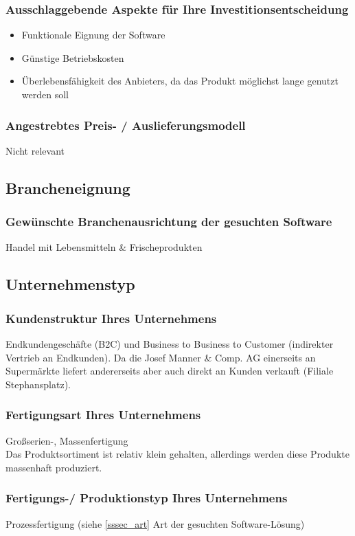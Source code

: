 \subsubsection{Ausschlaggebende Aspekte für Ihre Investitionsentscheidung}
\begin{itemize}
	\item Funktionale Eignung der Software
	\item Günstige Betriebskosten
	\item Überlebensfähigkeit des Anbieters, da das Produkt möglichst lange genutzt werden soll
\end{itemize}
\subsubsection{Angestrebtes Preis- / Auslieferungsmodell}
Nicht relevant

\subsection{Brancheneignung}
\subsubsection{Gewünschte Branchenausrichtung der gesuchten Software}
Handel mit Lebensmitteln \& Frischeprodukten

\subsection{Unternehmenstyp}
\subsubsection{Kundenstruktur Ihres Unternehmens}
Endkundengeschäfte (B2C) und Business to Business to Customer (indirekter Vertrieb an Endkunden). Da die Josef Manner \& Comp. AG einerseits an Supermärkte liefert andererseits aber auch direkt an Kunden verkauft (Filiale Stephansplatz).
\subsubsection{Fertigungsart Ihres Unternehmens}
Großserien-, Massenfertigung\\
Das Produktsortiment ist relativ klein gehalten, allerdings werden diese Produkte massenhaft produziert.

\subsubsection{Fertigungs-/ Produktionstyp Ihres Unternehmens}
Prozessfertigung (siehe \ref{sssec_art} Art der gesuchten Software-Lösung)

